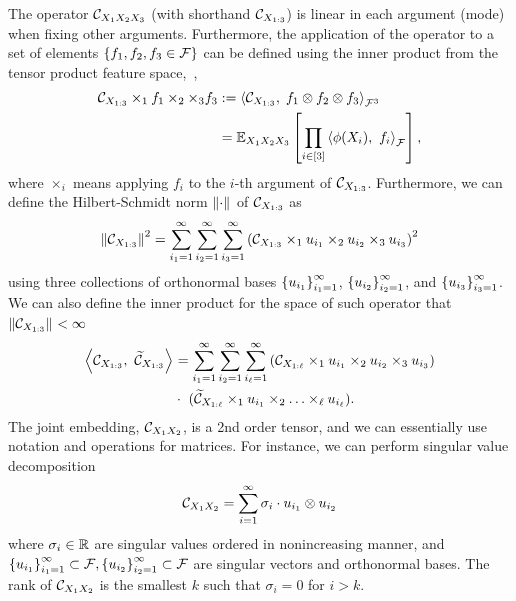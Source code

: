 \documentclass{article}
\begin{document}
The operator $\mathcal{C}_{X_1X_2X_3}$ (with shorthand $\mathcal{C}_{X_{1:3}}$) is linear in each argument (mode) when fixing other arguments. Furthermore, the application of the operator to a set of elements $\left\{f_1,f_2,f_3 \in \mathcal{F}\right\}$ can be defined using the inner product from the tensor product feature space,~\ie,
\begin{align}
	\mathcal{C}_{X_{1:3}} \times_1 f_1 \times_2 \times_3 f_3
	&:= 	\left\langle \mathcal{C}_{X_{1:3}},\;f_1\otimes f_2\otimes f_3 \right\rangle_{\mathcal{F}^3} \nonumber \\
	&=\mathbb{E}_{X_1X_2X_3}\left[\prod_{i \in [3]} \left\langle \phi(X_i),~f_i \right\rangle_{\mathcal{F}}\right], \nonumber
\end{align}
where $\times_i$ means applying $f_i$ to the $i$-th argument of $\mathcal{C}_{X_{1:3}}$. Furthermore, we can define the Hilbert-Schmidt norm $\left\|\cdot\right\|_{}$ of $\mathcal{C}_{X_{1:3}}$ as
\[
 \left\|\mathcal{C}_{X_{1:3}}\right\|_{}^2 = \sum_{i_1 = 1}^\infty \sum_{i_2 = 1}^\infty \sum_{i_3 = 1}^\infty \left(\mathcal{C}_{X_{1:3}} \times_1 u_{i_1} \times_2 u_{i_2} \times_3 u_{i_3}\right)^2
\]
using three collections of orthonormal bases $\left\{u_{i_1}\right\}_{i_1=1}^\infty$, $\left\{u_{i_2}\right\}_{i_2=1}^\infty$, and $\left\{u_{i_3}\right\}_{i_3=1}^\infty$. We can also define the inner product for the space of such operator that $\left\|\mathcal{C}_{X_{1:3}}\right\|_{}<\infty$
\begin{align}
	\left\langle \mathcal{C}_{X_{1:3}},~\widetilde{\mathcal{C}}_{X_{1:3}} \right\rangle_{}  &=  \sum_{i_1 = 1}^\infty \sum_{i_2 = 1}^\infty \sum_{i_\ell = 1}^\infty \left(\mathcal{C}_{X_{1:\ell}} \times_1 u_{i_1} \times_2 u_{i_2} \times_3 u_{i_3}\right) \nonumber \\
	& \cdot\ (\widetilde{\mathcal{C}}_{X_{1:\ell}} \times_1 u_{i_1} \times_2 \ldots \times_\ell u_{i_\ell}). \nonumber
\end{align}
%
The joint embedding, $\mathcal{C}_{X_1 X_2}$, is a 2nd order tensor, and we can essentially use notation and operations for matrices. For instance, we can perform singular value decomposition
\[
    \mathcal{C}_{X_1X_2} = \sum_{i=1}^{\infty} \sigma_i \cdot u_{i_1} \otimes u_{i_2}
\]
where $\sigma_i \in \mathbb{R}$ are singular values ordered in nonincreasing manner, and $\left\{u_{i_1}\right\}_{i_1=1}^{\infty} \subset \mathcal{F}, \left\{u_{i_2}\right\}_{i_2=1}^{\infty} \subset \mathcal{F}$ are singular vectors and orthonormal bases. The rank of $\mathcal{C}_{X_1X_2}$ is the smallest $k$ such that $\sigma_i = 0$ for $i > k$.
\end{document}
